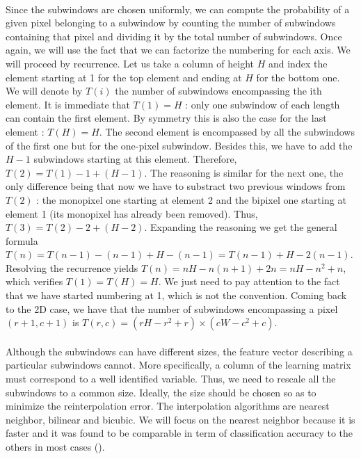 \documentclass[a4paper]{report}
\begin{document}
		\paragraph{}
		Since the subwindows are chosen uniformly, we can compute the probability of a given pixel belonging to a subwindow by counting the number of subwindows containing that pixel and dividing it by the total number of subwindows. Once again, we will use the fact that we can factorize the numbering for each axis. We will proceed by recurrence. Let us take a column of height $H$ and index the element starting at 1 for the top element and ending at $H$ for the bottom one. We will denote by $T(i)$ the number of subwindows encompassing the ith element. It is immediate that $T(1) = H$ : only one subwindow of each length can contain the first element. By symmetry this is also the case for the last element : $T(H) = H$. The second element is encompassed by all the subwindows of the first one but for the one-pixel subwindow. Besides this, we have to add the $H-1$ subwindows starting at this element. Therefore, $T(2) = T(1) - 1 + (H -1)$. The reasoning is similar for the next one, the only difference being that now we have to substract two previous windows from $T(2)$ : the monopixel one starting at element 2 and the bipixel one starting at element 1 (its monopixel has already been removed). Thus, $T(3) = T(2) - 2 + (H - 2)$. Expanding the reasoning we get the general formula $T(n) = T(n-1) - (n-1) + H - (n-1) = T(n-1) + H - 2(n-1)$. Resolving the recurrence yields $T(n) = nH - n(n+1) + 2n = nH -n^2 + n$, which verifies $T(1) = T(H) = H$. We just need to pay attention to the fact that we have started numbering at 1, which is not the convention.
		Coming back to the 2D case, we have that the number of subwindows encompassing a pixel $(r+1,c+1)$ is $T(r,c) = (rH - r^2 + r) \times (cW - c^2 + c)$.
		
		\paragraph{}
		Although the subwindows can have different sizes, the feature vector describing a particular subwindows cannot. More specifically, a column of the learning matrix must correspond to a well identified variable. Thus, we need to rescale all the subwindows to a common size. Ideally, the size should be chosen so as to minimize the reinterpolation error. The interpolation algorithms are nearest neighbor, bilinear and bicubic. We will focus on the nearest neighbor because it is faster and it was found to be comparable in term of classification accuracy to the others in most cases (\cite{}).
		
\end{document}
